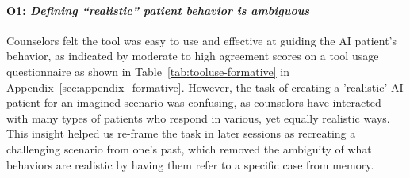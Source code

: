 \documentclass[11pt]{article}
\begin{document}
\paragraph{O1: \textit{Defining ``realistic'' patient behavior is ambiguous}} \label{sec:pilot-o1} 
Counselors felt the tool was easy to use and effective at guiding the AI patient's behavior, as indicated by moderate to high agreement scores on a tool usage questionnaire as shown in Table~\ref{tab:tooluse-formative} in Appendix~\ref{sec:appendix_formative}. %
However, the task of creating a 'realistic' AI patient for an imagined scenario was confusing, as counselors have interacted with many types of patients who respond in various, yet equally realistic ways. 
This insight helped us re-frame the task in later sessions as recreating a challenging scenario from one's past, which removed the ambiguity of what behaviors are realistic by having them refer to a specific case from memory. 
\end{document}
